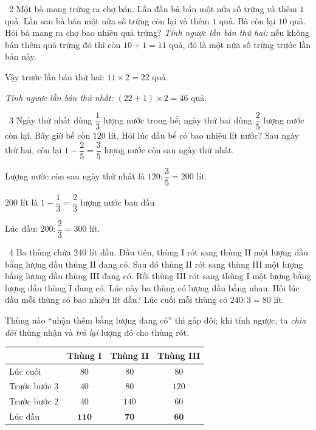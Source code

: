 \gap
\begin{exbox}{\ExWord\ 2}
Một bà mang trứng ra chợ bán. Lần đầu bà bán một nửa số trứng và thêm $1$ quả. Lần sau bà bán một nửa số trứng còn lại và thêm $1$ quả. Bà còn lại $10$ quả. Hỏi bà mang ra chợ bao nhiêu quả trứng?
\guide
\emph{Tính ngược lần bán thứ hai:} nếu không bán thêm quả trứng đó thì còn $10+1=11$ quả, đó là một nửa số trứng trước lần bán này.\par Vậy trước lần bán thứ hai: $11\times2=22$ quả.\par
\emph{Tính ngược lần bán thứ nhất:} $(22+1)\times2=46$ quả.
\end{exbox}
\gap
\begin{exbox}{\ExWord\ 3}
Ngày thứ nhất dùng $\dfrac13$ lượng nước trong bể; ngày thứ hai dùng $\dfrac25$ lượng nước còn lại. Bây giờ bể còn $120$ lít. Hỏi lúc đầu bể có bao nhiêu lít nước?
\guide
Sau ngày thứ hai, còn lại $1-\dfrac25=\dfrac35$ lượng nước còn sau ngày thứ nhất.\par Lượng nước còn sau ngày thứ nhất là $120:\dfrac35=200$ lít.\par
$200$ lít là $1-\dfrac13=\dfrac23$ lượng nước ban đầu.\par Lúc đầu: $200:\dfrac23=300$ lít.
\end{exbox}
\gap
\begin{exbox}{\ExWord\ 4}
Ba thùng chứa $240$ lít dầu. Đầu tiên, thùng I rót sang thùng II một lượng dầu bằng lượng dầu thùng II đang có. Sau đó thùng II rót sang thùng III một lượng bằng lượng dầu thùng III đang có. Rồi thùng III rót sang thùng I một lượng bằng lượng dầu thùng I đang có. Lúc này ba thùng có lượng dầu bằng nhau. Hỏi lúc đầu mỗi thùng có bao nhiêu lít dầu?
\guide
Lúc cuối mỗi thùng có $240:3=80$ lít.\par Thùng nào ``nhận thêm bằng lượng đang có'' thì gấp đôi; khi tính ngược, ta \emph{chia đôi} thùng nhận và \emph{trả lại} lượng đó cho thùng rót.
\begin{center}
\renewcommand{\arraystretch}{1.25}
\begin{tabular}{|l|c|c|c|}
\hline
 & Thùng I & Thùng II & Thùng III\\\hline
Lúc cuối & $80$ & $80$ & $80$\\\hline
Trước bước 3 & $40$ & $80$ & $120$\\\hline
Trước bước 2 & $40$ & $140$ & $60$\\\hline
Lúc đầu & $\mathbf{110}$ & $\mathbf{70}$ & $\mathbf{60}$\\\hline
\end{tabular}
\end{center}
\end{exbox}

